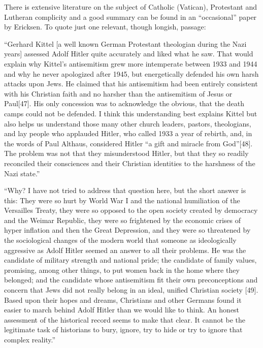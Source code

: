 There is extensive literature on the subject of Catholic (Vatican), Protestant and Lutheran complicity and a good summary can be found in an “occasional” paper by Ericksen. To quote just one relevant, though longish, passage:

\begin{myquote}
“Gerhard Kittel [a well known German Protestant theologian during the Nazi years] assessed Adolf Hitler quite accurately and liked what he saw. That would explain why Kittel’s antisemitism grew more intemperate between 1933 and 1944 and why he never apologized after 1945, but energetically defended his own harsh attacks upon Jews. He claimed that his antisemitism had been entirely consistent with his Christian faith and no harsher than the antisemitism of Jesus or Paul[47]. His only concession was to acknowledge the obvious, that the death camps could not be defended. I think this understanding best explains Kittel but also helps us understand those many other church leaders, pastors, theologians, and lay people who applauded Hitler, who called 1933 a year of rebirth, and, in the words of Paul Althaus, considered Hitler “a gift and miracle from God”[48]. The problem was not that they misunderstood Hitler, but that they so readily reconciled their consciences and their Christian identities to the harshness of the Nazi state.”

“Why? I have not tried to address that question here, but the short answer is this: They were so hurt by World War I and the national humiliation of the Versailles Treaty, they were so opposed to the open society created by democracy and the Weimar Republic, they were so frightened by the economic crises of hyper inflation and then the Great Depression, and they were so threatened by the sociological changes of the modern world that someone as ideologically aggressive as Adolf Hitler seemed an answer to all their problems. He was the candidate of military strength and national pride; the candidate of family values, promising, among other things, to put women back in the home where they belonged; and the candidate whose antisemitism fit their own preconceptions and concern that Jews did not really belong in an ideal, unified Christian society [49]. Based upon their hopes and dreams, Christians and other Germans found it easier to march behind Adolf Hitler than we would like to think. An honest assessment of the historical record seems to make that clear. It cannot be the legitimate task of historians to bury, ignore, try to hide or try to ignore that complex reality.”
\end{myquote}
\newpage

